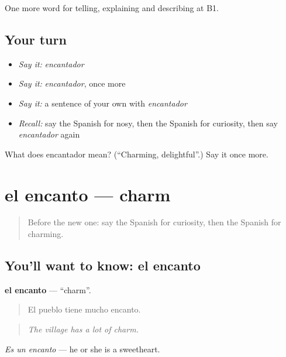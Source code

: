 \begin{grammarlens}[title={What you've built}]
One more word for telling, explaining and describing at B1.
\end{grammarlens}

\subsection*{Your turn}
\begin{itemize}
\raggedright
  \item \emph{Say it:} \emph{encantador}
  \item \emph{Say it:} \emph{encantador}, once more
  \item \emph{Say it:} a sentence of your own with \emph{encantador}
  \item \emph{Recall:} say the Spanish for nosy, then the Spanish for curiosity, then say \emph{encantador} again
\end{itemize}

\begin{tcolorbox}[breakable,colback=teal!4,colframe=teal!35!black,title={Before you move on}]
What does encantador mean? (\textquotedblleft{}Charming, delightful\textquotedblright{}.) Say it once more.
\end{tcolorbox}
\section[el encanto]{el encanto — charm}

\label{lesson:ES-C730-encanto}



\begin{quote}
Before the new one: say the Spanish for curiosity, then the Spanish for charming.
\end{quote}

\subsection*{You'll want to know: el encanto}
\textbf{el encanto} — \textquotedblleft{}charm\textquotedblright{}.

\begin{quote}
El pueblo tiene mucho encanto.
\end{quote}

\begin{quote}
\emph{The village has a lot of charm.}
\end{quote}

\emph{Es un encanto} — he or she is a sweetheart.

